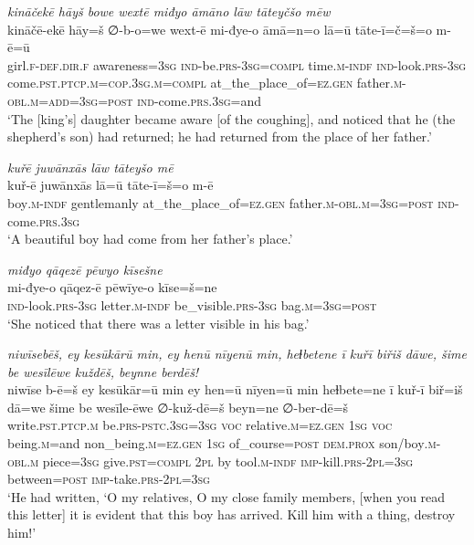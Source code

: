 \ea \label{KŠ.65}
\textit{kināčekē hāyš bowe wextē miđyo āmāno lāw tāteyčšo mēw} \\ 
\gll kināčē-ekē hāy=š ∅-b-o=we wext-ē mi-đye-o āmā=n=o lā=ū tāte-ī=č=š=o m-ē=ū \\ 
 girl\textsc{.f}\textsc{-def}\textsc{.dir}\textsc{.f} awareness\textsc{=3sg} \textsc{ind-}be\textsc{.prs}\textsc{-3sg}\textsc{=compl} time\textsc{.m}\textsc{-indf} \textsc{ind-}look\textsc{.prs}\textsc{-3sg} come\textsc{.pst}\textsc{.ptcp}\textsc{.m}\textsc{=cop}\textsc{.3sg}\textsc{.m}\textsc{=compl} at\_the\_place\_of\textsc{\textsc{=ez.gen}} father\textsc{.m}\textsc{-obl}\textsc{.m}\textsc{=add}\textsc{=3sg}\textsc{=\textsc{post}} \textsc{ind-}come\textsc{.prs}\textsc{.3sg}=and \\ 
\glt `The [king’s] daughter became aware [of the coughing], and noticed that he (the shepherd’s son) had returned; he had returned from the place of her father.'
\z 
 
\ea \label{KŠ.68}
\textit{kuřē juwānxās lāw tāteyšo mē} \\ 
\gll kuř-ē juwānxās lā=ū tāte-ī=š=o m-ē \\ 
 boy\textsc{.m}\textsc{-indf} gentlemanly at\_the\_place\_of\textsc{\textsc{=ez.gen}} father\textsc{.m}\textsc{-obl}\textsc{.m}\textsc{=3sg}\textsc{=\textsc{post}} \textsc{ind-}come\textsc{.prs}\textsc{.3sg} \\ 
\glt `A beautiful boy had come from her father’s place.'
\z 
 
\ea \label{KŠ.70}
\textit{miđyo qāqezē pēwyo kīsešne} \\ 
\gll mi-đye-o qāqez-ē pēwīye-o kīse=š=ne \\ 
 \textsc{ind-}look\textsc{.prs}\textsc{-3sg} letter\textsc{.m}\textsc{-indf} be\_visible\textsc{.prs}\textsc{-3sg} bag\textsc{.m}\textsc{=3sg}\textsc{=\textsc{post}} \\ 
\glt `She noticed that there was a letter visible in his bag.'
\z 
 
\ea \label{KŠ.72}
\textit{niwīsebēš, ey kesūkārū min, ey henū nīyenū min, heɫbetene ī kuřī biřiš dāwe, šime be wesīlēwe kuždēš, beynne berdēš!} \\ 
\gll niwīse b-ē=š ey kesūkār=ū min ey hen=ū nīyen=ū min heɫbete=ne ī kuř-ī biř=iš dā=we šime be wesīle-ēwe ∅-kuž-dē=š beyn=ne ∅-ber-dē=š \\ 
 write\textsc{.pst}\textsc{.ptcp}\textsc{.m} be\textsc{.prs}\textsc{-pstc}\textsc{.3sg}\textsc{=3sg} \textsc{voc} relative\textsc{.m}\textsc{\textsc{=ez.gen}} \textsc{1sg} \textsc{voc} being\textsc{.m}=and non\_being\textsc{.m}\textsc{\textsc{=ez.gen}} \textsc{1sg} of\_course\textsc{=\textsc{post}} \textsc{dem.prox} son/boy\textsc{.m}\textsc{-obl}\textsc{.m} piece\textsc{=3sg} give\textsc{.pst}\textsc{=compl} \textsc{2pl} by tool\textsc{.m}\textsc{-indf} \textsc{imp-}kill\textsc{.prs}-\textsc{2pl}\textsc{=3sg} between\textsc{=\textsc{post}} \textsc{imp-}take\textsc{.prs}-\textsc{2pl}\textsc{=3sg} \\ 
\glt `He had written, ‘O my relatives, O my close family members, [when you read this letter] it is evident that this boy has arrived. Kill him with a thing, destroy him!'
\z 
 
